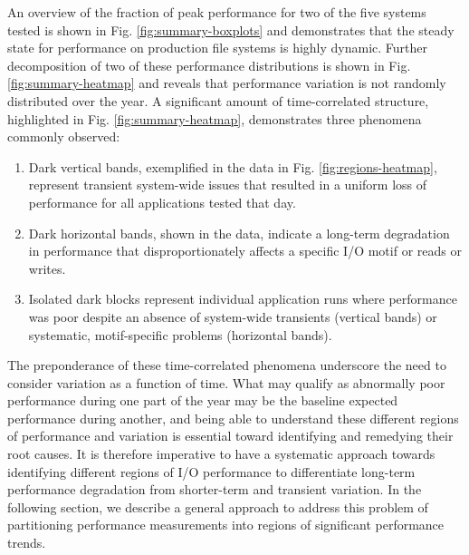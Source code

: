 An overview of the fraction of peak performance for two of the five systems tested is shown in Fig. \ref{fig:summary-boxplots} and demonstrates that the steady state for performance on production file systems is highly dynamic.
Further decomposition of two of these performance distributions is shown in Fig. \ref{fig:summary-heatmap} and reveals that performance variation is not randomly distributed over the year.
A significant amount of time-correlated structure, highlighted in Fig. \ref{fig:summary-heatmap}, demonstrates three phenomena commonly observed:

\begin{enumerate}[leftmargin=*]
\item Dark vertical bands, exemplified in the \mira data in Fig. \ref{fig:regions-heatmap}, represent transient system-wide issues that resulted in a uniform loss of performance for all applications tested that day.
\item Dark horizontal bands, shown in the \cori data, indicate a long-term degradation in performance that disproportionately affects a specific I/O motif or reads or writes.
\item Isolated dark blocks represent individual application runs where performance was poor despite an absence of system-wide transients (vertical bands) or systematic, motif-specific problems (horizontal bands).
\end{enumerate}


The preponderance of these time-correlated phenomena underscore the need to consider variation as a function of time.
What may qualify as abnormally poor performance during one part of the year may be the baseline expected performance during another, and being able to understand these different regions of performance and variation is essential toward identifying and remedying their root causes.
It is therefore imperative to have a systematic approach towards identifying different regions of I/O performance to differentiate long-term performance degradation from shorter-term and transient variation.
In the following section, we describe a general approach to address this problem of partitioning performance measurements into regions of significant performance trends.



